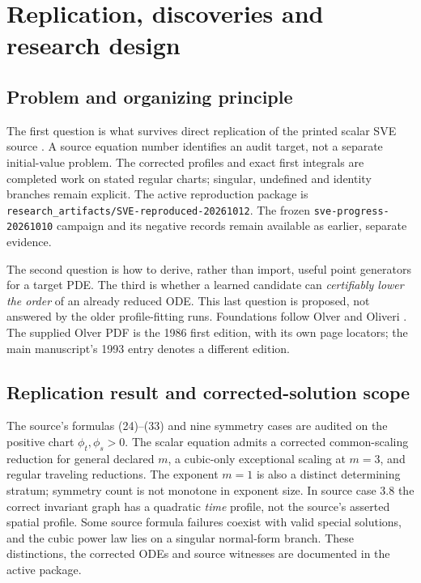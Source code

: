 \documentclass[12pt,a4paper,oneside]{report}
\numberwithin{equation}{chapter}
\DeclareRobustCommand{\code}[1]{\nolinkurl{#1}}
\begin{document}
\chapter{Replication, discoveries and research design}\label{ch:synopsis}
\section{Problem and organizing principle}
The first question is what survives direct replication of the printed scalar
SVE source \cite{ap}. A source equation number identifies an audit target,
not a separate initial-value problem. The corrected profiles and exact first
integrals are completed work on stated regular charts; singular, undefined
and identity branches remain explicit. The active reproduction package is
\code{research_artifacts/SVE-reproduced-20261012}. The frozen
\code{sve-progress-20261010} campaign and its negative records remain
available as earlier, separate evidence.

The second question is how to derive, rather than import, useful point
generators for a target PDE. The third is whether a learned candidate can
\emph{certifiably lower the order} of an already reduced ODE. This last
question is proposed, not answered by the older profile-fitting runs.
Foundations follow Olver and Oliveri \cite{olver,olver1986,oliveri2026}.
The supplied Olver PDF is the 1986 first edition, with its own page locators;
the main manuscript's 1993 entry denotes a different edition.

\section{Replication result and corrected-solution scope}
\label{sec:dissertation-replication}
The source's formulas (24)--(33) and nine symmetry cases are audited on the
positive chart $\phi_t,\phi_s>0$. The scalar equation admits a corrected
common-scaling reduction for general declared $m$, a cubic-only exceptional
scaling at $m=3$, and regular traveling reductions. The exponent $m=1$ is
also a distinct determining stratum; symmetry count is not monotone in
exponent size. In source case 3.8 the correct invariant graph has a
quadratic \emph{time} profile, not the source's asserted spatial profile.
Some source formula failures coexist with valid special solutions, and the
cubic power law lies on a singular normal-form branch. These distinctions,
the corrected ODEs and source witnesses are documented in the active package.
\end{document}
